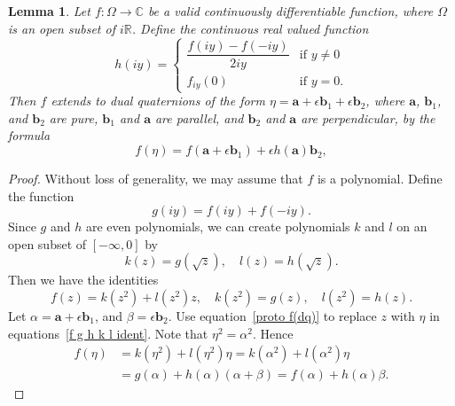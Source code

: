\documentclass[12pt,reqno]{amsart}
\newtheorem{lemma}[theorem]{Lemma}
\begin{document}
\begin{lemma}
\label{f(dq) anti commute}
Let $f:\Omega \to \mathbb C$ be a valid continuously differentiable function, where $\Omega$ is an open subset of $i\mathbb R$.  Define the continuous real valued function
\begin{equation}
\label{h ident 2}
h(iy) = \begin{cases}
\dfrac{f(iy) - f(-iy)}{2iy} &\text{if $y \ne 0$} \\
f_{iy}(0) &\text{if $y = 0$} .
\end{cases}
\end{equation}
Then $f$ extends to dual quaternions of the form $\eta = \bm a + \epsilon \bm b_1 + \epsilon \bm b_2$, where $\bm a$, $\bm b_1$, and $\bm b_2$ are pure, $\bm b_1$ and $\bm a$ are parallel, and $\bm b_2$ and $\bm a$ are perpendicular, by the formula
\begin{equation}
\label{f(dq) anti commute equ}
f(\eta) = f(\bm a + \epsilon \bm b_1) + \epsilon h(\bm a) \bm b_2 ,
\end{equation}
\end{lemma}

\begin{proof}  Without loss of generality, we may assume that $f$ is a polynomial.  Define the function
\begin{equation}
g(iy) = f(iy) + f(-iy) .
\end{equation}
Since $g$ and $h$ are even polynomials, we can create polynomials $k$ and $l$ on an open subset of $[-\infty,0]$ by
\begin{equation}
k(z) = g(\sqrt z), \quad l(z) = h(\sqrt z) .
\end{equation}
Then we have the identities
\begin{equation}
\label{f g h k l ident}
f(z) = k(z^2) + l(z^2) z , \quad k(z^2) = g(z), \quad l(z^2) = h(z) .
\end{equation}
Let $\alpha = \bm a + \epsilon \bm b_1$, and $\beta = \epsilon\bm b_2$.  Use equation~\eqref{proto f(dq)} to replace $z$ with $\eta$ in equations~\eqref{f g h k l ident}.  Note that $\eta^2 = \alpha^2$.  Hence
\begin{equation}
\begin{aligned}
f(\eta)
&= k(\eta^2) + l(\eta^2) \eta = k(\alpha^2) + l(\alpha^2) \eta \\
&= g(\alpha) + h(\alpha) (\alpha + \beta) = f(\alpha) + h(\alpha) \beta.
\end{aligned}
\end{equation}
\end{proof}
\end{document}

